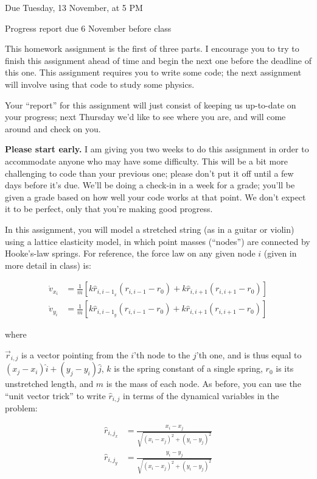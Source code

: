 \documentclass[12pt]{article}
\begin{document}
\Large
\centerline{}
\centerline{Due Tuesday, 13 November, at 5 PM}
\centerline{Progress report due 6 November before class}
\normalsize

This homework assignment is the first of three parts. I encourage you to try to finish this assignment ahead of time
and begin the next one before the deadline of this one. This assignment requires you to write some code; the next assignment will involve using that code to study
some physics.

Your ``report'' for this assignment will just consist of keeping us up-to-date on your progress; next Thursday we'd like to see where you are, and will come around
and check on you.

{\bf Please start early.} 
I am giving you two weeks to do this assignment in order to accommodate anyone who may have some difficulty.
This will be a bit more challenging to code than your previous one; please don't put it off until a few days before it's due.
We'll be doing a check-in in a week for a grade; you'll be given a grade based on how well your code works at that point. We don't
expect it to be perfect, only that you're making good progress.

In this assignment, you will model a stretched string (as in a guitar or violin) using a lattice elasticity model, in which point masses (``nodes'') are connected by Hooke's-law springs.
For reference, the force law on any given node $i$ (given in more detail in class) is:

\begin{align}
  \dot v_{x_i} &= \frac{1}{m} \left[ k \hat r_{{i,i-1}_x} (r_{i,i-1} - r_0) + k \hat r_{i,i+1} (r_{i,i+1} - r_0) \right] \\
  \dot v_{y_i} &= \frac{1}{m} \left[ k \hat r_{{i,i-1}_y} (r_{i,i-1} - r_0) + k \hat r_{i,i+1} (r_{i,i+1} - r_0) \right]
\end{align}

where

$\vec r_{i,j}$ is a vector pointing from the $i$'th node to the $j$'th one, and is thus equal to $(x_j-x_i)\hat i + (y_j-y_i)\hat j$, $k$ is the spring constant of a single spring, $r_0$ is its unstretched length, and $m$ is the mass of each node.
As before, you can use the ``unit vector trick'' to write $\hat r_{i,j}$ in terms of the dynamical variables in the problem:

\begin{align}
  \hat r_{{i,j}_x} &= \frac{x_i - x_j}{\sqrt{(x_i-x_j)^2 + (y_i-y_j)^2}}\\
  \hat r_{{i,j}_y} &= \frac{y_i - y_j}{\sqrt{(x_i-x_j)^2 + (y_i-y_j)^2}}
\end{align}
\end{document}
